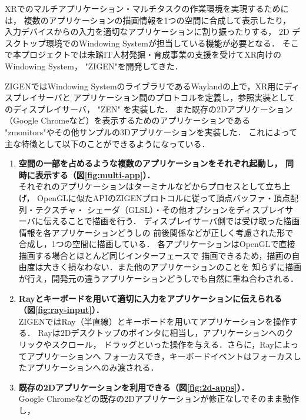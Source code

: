 XRでのマルチアプリケーション・マルチタスクの作業環境を実現するためには，
複数のアプリケーションの描画情報を1つの空間に合成して表示したり，
入力デバイスからの入力を適切なアプリケーションに割り振ったりする，
2D デスクトップ環境でのWindowing Systemが担当している機能が必要となる．
そこで本プロジェクトでは未踏IT人材発掘・育成事業の支援を受けてXR向けのWindowing System，
"ZIGEN"を開発してきた．

ZIGENではWindowing SystemのライブラリであるWaylandの上で，XR用にディスプレイサーバと
アプリケーション間のプロトコルを定義し，参照実装としてのディスプレイサーバ， "ZEN" を実装した．
また既存の2Dアプリケーション（Google Chromeなど）を表示するためのアプリケーションである
"zmonitors"やその他サンプルの3Dアプリケーションを実装した．
これによって主な特徴として以下のことができるようになっている．

\begin{enumerate}
  \item \textbf{空間の一部を占めるような複数のアプリケーションをそれぞれ起動し，
          同時に表示する（図\ref{fig:multi-app}）．}\\
        それぞれのアプリケーションはターミナルなどからプロセスとして立ち上げ，
        OpenGLに似たAPIのZIGENプロトコルに従って頂点バッファ・頂点配列・テクスチャ・
        シェーダ（GLSL）・その他オプションをディスプレイサーバに伝えることで描画を行う．
        ディスプレイサーバ側では受け取った描画情報を各アプリケーションどうしの
        前後関係などが正しく考慮された形で合成し，1つの空間に描画している．
        各アプリケーションはOpenGLで直接描画する場合とほとんど同じインターフェースで
        描画できるため，描画の自由度は大きく損なわない．また他のアプリケーションのことを
        知らずに描画が行え，開発元の違うアプリケーションどうしでも自然に重ね合わされる．
  \item \textbf{Rayとキーボードを用いて適切に入力をアプリケーションに伝えられる
          （図\ref{fig:ray-input}）．}\\
        ZIGENではRay（半直線）とキーボードを用いてアプリケーションを操作する．
        Rayは2Dデスクトップのポインタに相当し，アプリケーションへのクリックやスクロール，
        ドラッグといった操作を与える．さらに，Rayによってアプリケーションへ
        フォーカスでき，キーボードイベントはフォーカスしたアプリケーションへのみ渡される．
  \item \textbf{既存の2Dアプリケーションを利用できる（図\ref{fig:2d-apps}）．}\\
        Google Chromeなどの既存の2Dアプリケーションが修正なしでそのまま動作し，

\end{enumerate}

